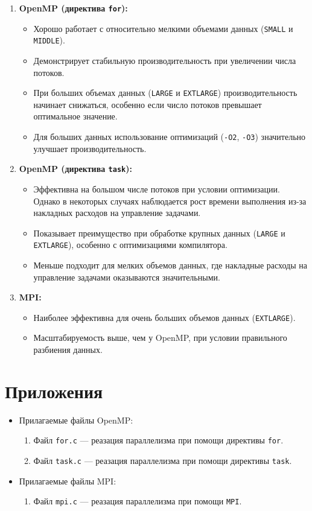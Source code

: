 \documentclass[a4paper, 11pt]{article}
\begin{document}
\begin{enumerate}
    \item \textbf{OpenMP (директива \texttt{for}):}
    \begin{itemize}
        \item Хорошо работает с относительно мелкими объемами данных (\texttt{SMALL} и \texttt{MIDDLE}).
        \item Демонстрирует стабильную производительность при увеличении числа потоков.
        \item При больших объемах данных (\texttt{LARGE} и \texttt{EXTLARGE}) производительность начинает снижаться, особенно если число потоков превышает оптимальное значение.
        \item Для больших данных использование оптимизаций (\texttt{-O2}, \texttt{-O3}) значительно улучшает производительность.
    \end{itemize}

    \item \textbf{OpenMP (директива \texttt{task}):}
    \begin{itemize}
        \item Эффективна на большом числе потоков при условии оптимизации. Однако в некоторых случаях наблюдается рост времени выполнения из-за накладных расходов на управление задачами.
        \item Показывает преимущество при обработке крупных данных (\texttt{LARGE} и \texttt{EXTLARGE}), особенно с оптимизациями компилятора.
        \item Меньше подходит для мелких объемов данных, где накладные расходы на управление задачами оказываются значительными.
    \end{itemize}

    \item \textbf{MPI:}
    \begin{itemize}
        \item Наиболее эффективна для очень больших объемов данных (\texttt{EXTLARGE}).
        \item Масштабируемость выше, чем у OpenMP, при условии правильного разбиения данных.
    \end{itemize}
\end{enumerate}
\newpage

\section*{Приложения}
\begin{itemize}
    \item Прилагаемые файлы OpenMP:
    \begin{enumerate}
        \item Файл \texttt{for.c} --- реазация параллелизма при помощи директивы \texttt{for}. 
        \item Файл \texttt{task.c} --- реазация параллелизма при помощи директивы \texttt{task}. 
    \end{enumerate}
\end{itemize}

\begin{itemize}
    \item Прилагаемые файлы MPI:
    \begin{enumerate}
        \item Файл \texttt{mpi.c} --- реазация параллелизма при помощи \texttt{MPI}. 
    \end{enumerate}
\end{itemize}
\end{document}
